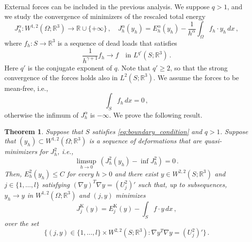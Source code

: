 \documentclass{article}
\theoremstyle{plain}
\newtheorem{teo}{Theorem}[section]
\theoremstyle{plain}
\theoremstyle{plain}
\theoremstyle{plain}
\theoremstyle{plain}
\theoremstyle{definition}
\theoremstyle{definition}
\renewcommand{\r}{\mathbb{R}}
\DeclareMathOperator{\KL}{K}
\begin{document}
External forces can be included in the previous analysis. We suppose $q > 1$, and we study the convergence of minimizers of the rescaled total energy
\begin{equation}\label{eq:definition_total-energy}
	J_h^\alpha \colon W^{1, 2}(\Omega; \r^3) \to \r \cup \{+ \infty\}\,, \quad J_h^\alpha(y_h) = E_h^\alpha(y_h) - \dfrac{1}{h^\alpha}\int_\Omega f_h \cdot y_h \, dx \,,
\end{equation}
where $f_h \colon S \to \r^3$ is a sequence of dead loads that satisfies
\begin{equation}\label{eq:convergence_forces}
	\dfrac{1}{h^{\gamma+1}}f_h \to f \quad \text{in} \, \, L^{q'}(S; \r^3) \,.
\end{equation}
Here $q'$ is the conjugate exponent of $q$. Note that $q' \geq 2$, so that the strong convergence of the forces holds also in $L^2(S; \r^3)$. We assume the forces to be mean-free, i.e.,
\[
	\int_S f_h \, dx = 0\,,
\]
otherwise the infimum of $J_h^\alpha$ is $-\infty$. We prove the following result.

\begin{teo}\label{teo:convergence_minimizers_alpha_2}
	Suppose that $S$ satisfies \eqref{eq:boundary_condition} and $q > 1$. Suppose that $(y_h) \subset W^{1,2}(\Omega; \r^3)$ is a sequence of deformations that are quasi-minimizers for $J_h^2$, i.e.,
	\[
		\limsup_{h \to 0} \, (J_h^2(y_h) - \inf J_h^2) =0 \,.
	\]
	Then, $E_h^2(y_h) \leq C$ for every $h > 0$ and there exist $y \in W^{2, 2}(S; \r^3)$ and $j \in \{1, \dots, l\}$ satisfying $(\nabla y)^T\nabla y = (U_j^2)'$ such that, up to subsequences, $y_h \to y$ in $W^{1, 2}(\Omega; \r^3)$ and $(j, y)$ minimizes
	\[
		J^{\KL}_j(y) = E^{\KL}_j(y) - \int_S f \cdot y \, dx \,,
	\]
	over the set
	\[
		\{(j, y) \in \{1, \dots, l\} \times W^{2, 2}(S; \r^3) \colon \nabla y^T \nabla y = (U_j^2)'\}\,.
	\]
\end{teo}
\end{document}
